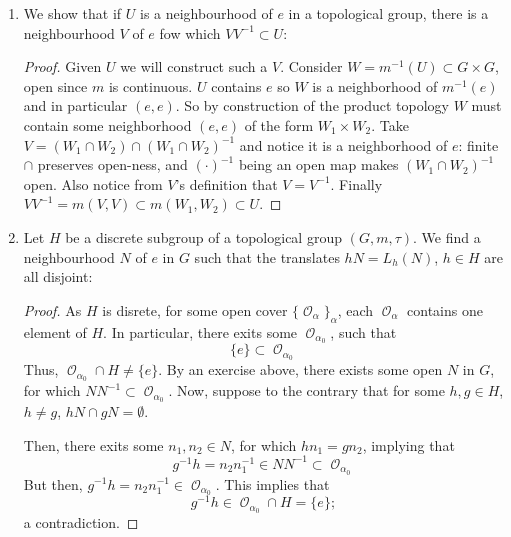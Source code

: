 \documentclass{book}
\DeclareMathOperator*{\Ocal}{\mathcal{O}}
\newcommand\red[1]{{\color{red} #1}}
\begin{document}
\begin{enumerate}[(1)]
{\begin{proof}
            $\{c_a\}_{a\in A}$ is an open cover of $A$ so it contains some finite subcover with indices $\iota \subset A$. 
            Thus $\cup_{a\in \iota} \mathcal{B}_a$ is a finite subcover of $AB$: by construction it is finite and by construction any $ab$ has some $i\in \iota$ for which $a\in c_i,$ and $s\in \mathcal{B}_i$ where $c_ib\subset s$ whence $ab\in s \in \mathcal{O}$.
        \end{proof} }

    \item We show that if $U$ is a neighbourhood of $e$ in a topological group, there is a neighbourhood $V$ of $e$ fow which $VV^{-1} \subset U$:  
        \red{ \begin{proof} 
            Given $U$ we will construct such a $V$.
            Consider $W = m^{-1}(U) \subset G\times G$, open since $m$ is continuous.
            $U$ contains $e$ so $W$ is a neighborhood of $m^{-1}(e)$ and in particular $(e,e)$. 
            So by construction of the product topology $W$ must contain some neighborhood $(e,e)$ of the form $W_1\times W_2$. 
            Take $V=(W_1\cap W_2)\cap(W_1\cap W_2)^{-1}$ and notice it is a neighborhood of $e$: 
                finite $\cap$ preserves open-ness, and $(\cdot)^{-1}$ being an open map makes $(W_1\cap W_2)^{-1}$ open. 
            Also notice from $V$'s definition that $V=V^{-1}$. 
            Finally $VV^{-1} = m(V,V) \subset m(W_1,W_2) \subset U$.
        \end{proof} }

    \item Let $H$ be a discrete subgroup of a topological group $(G, m, \tau)$. We find a neighbourhood $N$ of $e$ in $G$ such that the translates $hN = L_h(N)$, $h \in H$ are all disjoint: 
        \begin{proof} As $H$ is disrete, for some open cover $\{\Ocal_\alpha\}_\alpha$, each $\Ocal_\alpha$ contains one element of $H$. In particular, there exits some $\Ocal_{\alpha_0}$, such that 
            \[\{e\} \subset \Ocal_{\alpha_0}\]
            Thus, $\Ocal_{\alpha_0} \cap H \neq \{e\}$. By an exercise above, there exists some open $N$ in $G$, for which $NN^{-1} \subset \Ocal_{\alpha_0}$. Now, suppose to the contrary that for some $h,g \in H$, $h \neq g$, $hN \cap gN = \emptyset$. 
            \par Then, there exits some $n_1, n_2 \in N$, for which $hn_1 = g n_2$, implying that 
            \[g^{-1}h = n_2n_1^{-1} \in NN^{-1} \subset \Ocal_{\alpha_0} \]
            But then, $g^{-1}h = n_2n_1^{-1} \in \Ocal_{\alpha_0}$. This implies that 
            \[g^{-1}h \in \Ocal_{\alpha_0} \cap H = \{e\};\]
            a contradiction.
        \end{proof}


\end{enumerate}
\end{document}
